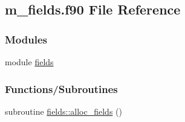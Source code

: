 \hypertarget{m__fields_8f90}{}\subsection{m\+\_\+fields.\+f90 File Reference}
\label{m__fields_8f90}
\subsubsection*{Modules}
\begin{DoxyCompactItemize}
\item 
module \hyperlink{namespacefields}{fields}
\end{DoxyCompactItemize}
\subsubsection*{Functions/\+Subroutines}
\begin{DoxyCompactItemize}
\item 
subroutine \hyperlink{namespacefields_a92712559b1d862a268d6318ac9d3a743}{fields\+::alloc\+\_\+fields} ()
\end{DoxyCompactItemize}

